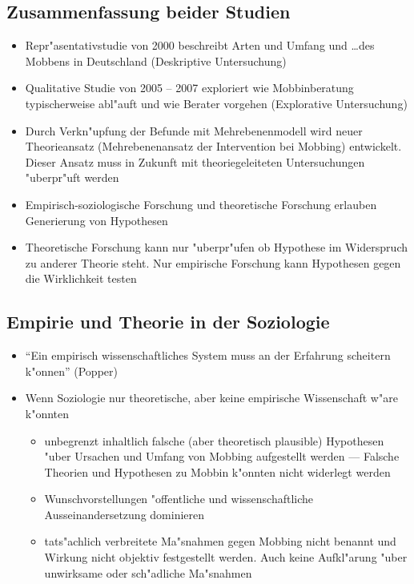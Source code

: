 \subsection{Zusammenfassung beider Studien}
\begin{itemize}
	\item
		Repr"asentativstudie von 2000 beschreibt Arten und Umfang und \dots des Mobbens in Deutschland (Deskriptive Untersuchung)
	\item
		Qualitative Studie von 2005 -- 2007 exploriert wie Mobbinberatung typischerweise abl"auft und wie Berater vorgehen (Explorative Untersuchung)
	\item
		Durch Verkn"upfung der Befunde mit Mehrebenenmodell wird neuer Theorieansatz (Mehrebenenansatz der Intervention bei Mobbing) entwickelt. Dieser Ansatz muss in Zukunft mit theoriegeleiteten Untersuchungen "uberpr"uft werden
	\item
		Empirisch-soziologische Forschung und theoretische Forschung erlauben Generierung von Hypothesen
	\item
		Theoretische Forschung kann nur "uberpr"ufen ob Hypothese im Widerspruch zu anderer Theorie steht. Nur empirische Forschung kann Hypothesen gegen die Wirklichkeit testen
\end{itemize}
\subsection{Empirie und Theorie in der Soziologie}
\begin{itemize}
	\item
		\enquote{Ein empirisch wissenschaftliches System muss an der Erfahrung scheitern k"onnen} (Popper)
	\item
		Wenn Soziologie nur theoretische, aber keine empirische Wissenschaft w"are k"onnten
		\begin{itemize}
			\item
				unbegrenzt inhaltlich falsche (aber theoretisch plausible) Hypothesen "uber Ursachen und Umfang von Mobbing aufgestellt werden --- Falsche Theorien und Hypothesen zu Mobbin k"onnten nicht widerlegt werden
			\item
				Wunschvorstellungen "offentliche und wissenschaftliche Ausseinandersetzung dominieren
			\item
				tats"achlich verbreitete Ma"snahmen gegen Mobbing nicht benannt und Wirkung nicht objektiv festgestellt werden. Auch keine Aufkl"arung "uber unwirksame oder sch"adliche Ma"snahmen
		\end{itemize}
\end{itemize}

